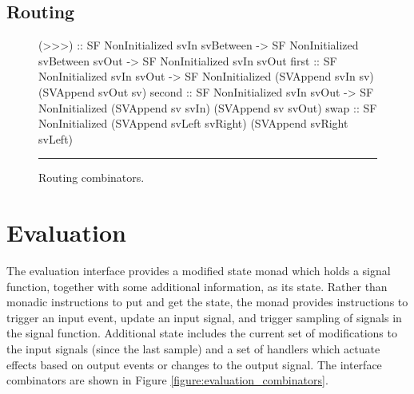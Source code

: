 \subsection{Routing}
\label{subsection:System_Design_and_Interface-Combinators-Routing}

\begin{figure}
\begin{code}
(>>>)       ::    SF NonInitialized svIn svBetween
               -> SF NonInitialized svBetween svOut
               -> SF NonInitialized svIn svOut
first       ::    SF NonInitialized svIn svOut
               -> SF NonInitialized (SVAppend svIn sv)
                                    (SVAppend svOut sv)
second      ::    SF NonInitialized svIn svOut
               -> SF NonInitialized (SVAppend sv svIn)
                                    (SVAppend sv svOut)
swap        ::    SF NonInitialized (SVAppend svLeft svRight) 
                                    (SVAppend svRight svLeft)
\end{code}
\hrule
\caption{Routing combinators.}
\label{figure:routing_combinators}
\end{figure}

\section{Evaluation}
\label{section:System_Design_and_Interface-Evaluator}

The evaluation interface provides a modified state monad which holds a signal
function, together with some additional information, as its state. Rather than
monadic instructions to put and get the state, the monad provides instructions
to trigger an input event, update an input signal, and trigger sampling of
signals in the signal function. Additional state includes the current set of
modifications to the input signals (since the last sample) and a set of
handlers which actuate effects based on output events or changes to the output
signal. The interface combinators are shown in Figure \ref{figure:evaluation_combinators}.

